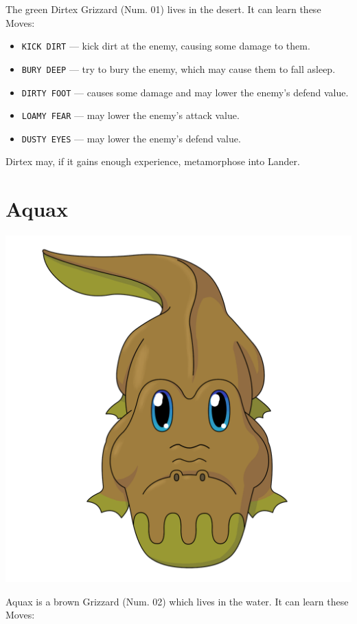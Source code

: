 \documentclass[10pt,twocolumn,openany,article]{memoir}
\begin{document}
The green  Dirtex Grizzard (Num. 01)  lives in the desert.  It can learn
these Moves:

\begin{itemize}
\item \texttt{KICK DIRT} --- kick dirt at the enemy, causing some damage
  to them.
\item \texttt{BURY DEEP} --- try to bury the enemy, which may cause them
  to fall asleep.
\item  \texttt{DIRTY FOOT}  --- causes  some  damage and  may lower  the
  enemy's defend value.
\item \texttt{LOAMY FEAR} --- may lower the enemy's attack value.
\item \texttt{DUSTY EYES} --- may lower the enemy's defend value.
\end{itemize}

Dirtex may, if it gains enough experience, metamorphose into Lander.

\fi

\section{Aquax}

\includegraphics[width=\columnwidth]{../Manual/Aquax.png}

Aquax is  a brown Grizzard  (Num. 02) which lives  in the water.  It can
learn these Moves:
\end{document}
